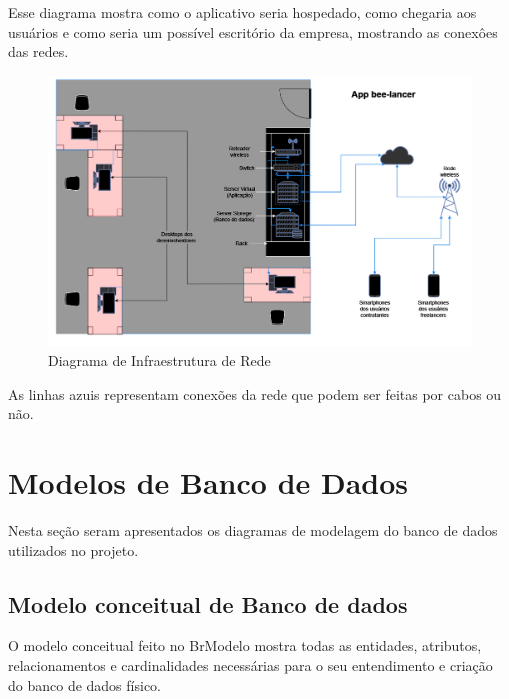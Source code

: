 \documentclass[
  a4paper,%
  12pt,%
  english,%
  brazilian,%
]{article}
\begin{document}
    Esse diagrama mostra como o aplicativo seria hospedado, como chegaria aos usuários e como seria um possível escritório da empresa, mostrando as conexôes das redes.

\begin{figure}[h]
\centering
\caption{Diagrama de Infraestrutura de Rede}%
\label{fig:diagrama-classe}
 \includegraphics[width=1\textwidth]{fotos/Diagrama de Infraestrutura de Rede PI.png}
\end{figure}

     As linhas azuis representam conexões da rede que podem ser feitas por cabos ou não.

\break

\section*{Modelos de Banco de Dados}
    Nesta seção seram apresentados os diagramas de modelagem do banco de dados utilizados no projeto.


\subsection*{Modelo conceitual de Banco de dados}

    O modelo conceitual feito no BrModelo mostra todas as entidades, atributos, relacionamentos e cardinalidades necessárias para o seu entendimento e criação do banco de dados físico.
\end{document}
